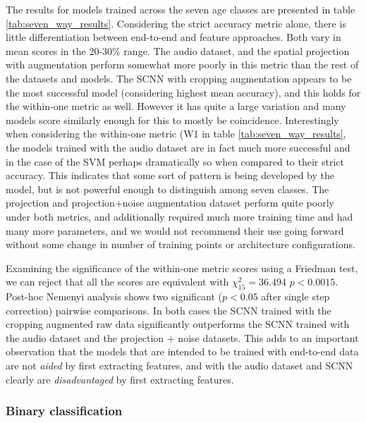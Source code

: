 \documentclass[fleqn,10pt]{wlscirep}
\begin{document}
The results for models trained across the seven age classes are presented in table \ref{tab:seven_way_results}. Considering the strict accuracy metric alone, there is little differentiation between end-to-end and feature approaches. Both vary in mean scores in the 20-30\% range. The audio dataset, and the spatial projection with augmentation perform somewhat more poorly in this metric than the rest of the datasets and models. The SCNN with cropping augmentation appears to be the most successful model (considering highest mean accuracy), and this holds for the within-one metric as well. However it has quite a large variation and many models score similarly enough for this to mostly be coincidence. Interestingly when considering the within-one metric (W1 in table \ref{tab:seven_way_results}, the models trained with the audio dataset are in fact much more successful and in the case of the SVM perhaps dramatically so when compared to their strict accuracy. This indicates that some sort of pattern is being developed by the model, but is not powerful enough to distinguish among seven classes. The projection and projection+noise augmentation dataset perform quite poorly under both metrics, and additionally required much more training time and had many more parameters, and we would not recommend their use going forward without some change in number of training points or architecture configurations.

Examining the significance of the within-one metric scores using a Friedman test, we can reject that all the scores are equivalent with $\chi^2_{15}=36.494$ $p<0.0015$. Post-hoc Nemenyi analysis shows two significant ($p<0.05$ after single step correction) pairwise comparisons. In both cases the SCNN trained with the cropping augmented raw data significantly outperforms the SCNN trained with the audio dataset and the projection + noise datasets. This adds to an important observation that the models that are intended to be trained with end-to-end data are not {\em aided} by first extracting features, and with the audio dataset and SCNN clearly are {\em disadvantaged} by first extracting features. 

\subsubsection*{Binary classification}
\end{document}
